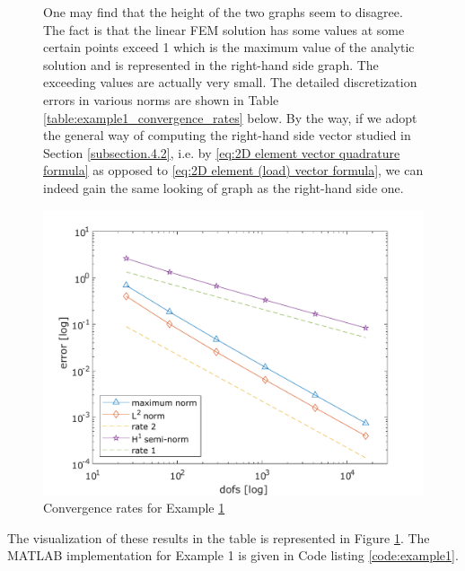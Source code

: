 	\begin{figure}[!htbp]
	\begin{minipage}{.5\textwidth}
	One may find that the height of the two graphs seem to disagree. The fact 
	is that the linear FEM solution has some values at some certain points
	exceed 1 which is the maximum value of the analytic solution and is 
	represented in the right-hand side graph. The exceeding values are actually
	very small. The detailed discretization errors in various norms are shown
	in Table \ref{table:example1_convergence_rates} below. By the way, if we
	adopt the general way of computing the right-hand side vector studied in
	Section \ref{subsection.4.2}, i.e. by
	\eqref{eq:2D element vector quadrature formula} as opposed to 
	\eqref{eq:2D element (load) vector formula}, we can indeed gain the same 
	looking of graph as the right-hand side one.
	\end{minipage}%
	\begin{minipage}{.5\textwidth}		
			\includegraphics[width=1\linewidth]{svg/error_estimates}
			\caption{Convergence rates for Example \hyperref[code:example1]{1}}
			\label{fig:error_estimates}		
	\end{minipage}
	\end{figure}

 	The visualization of these results in the table is represented in Figure
 	\ref{fig:error_estimates}.	The MATLAB implementation for Example 1 is 
 	given in Code listing \ref{code:example1}.
	
	\begin{table}[!htbp]
		\caption{Discretization errors and convergence rates in various
			norms for Example \hyperref[code:example1]{1}}\vspace{-5pt}
		
		\label{table:example1_convergence_rates}
	\end{table}\vspace{-15pt}	
	
